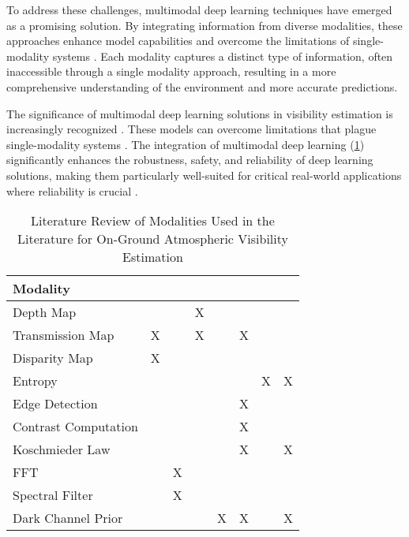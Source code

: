 
To address these challenges, multimodal deep learning techniques have emerged as a promising solution. By integrating information from diverse modalities, these approaches enhance model capabilities and overcome the limitations of single-modality systems \cite{liu2018learn, castanedo2013review, molino2021improved, blasch2021machine}. Each modality captures a distinct type of information, often inaccessible through a single modality approach, resulting in a more comprehensive understanding of the environment and more accurate predictions.

The significance of multimodal deep learning solutions in visibility estimation is increasingly recognized \cite{palvanov_visnet_2019, department_of_computer_science_chu_hai_college_of_higher_education_80_castle_peak_road_castle_peak_bay_tuen_mun_nt_hong_kong_meteorology_2020, AitOuadil2023, app11030997, Zhang2023, You2022, Chen2022, Wauben2016, Cheng2018, Zhou2021}. These models can overcome limitations that plague single-modality systems \cite{huang2021makesmultimodallearningbetter}. The integration of multimodal deep learning (\cref{tab:literature_review}) significantly enhances the robustness, safety, and reliability of deep learning solutions, making them particularly well-suited for critical real-world applications where reliability is crucial \cite{6817512, liang2024foundationsmultisensoryartificialintelligence}.



\begin{table}[htbp]
\centering
\caption{Literature Review of Modalities Used in the Literature for On-Ground Atmospheric Visibility Estimation}
\label{tab:literature_review}
\begin{tabular}{@{}lccccccc@{}}
\toprule
\textbf{Modality} & \textbf{\cite{You2022}} & \textbf{\cite{Palvanov2019}} & \textbf{\cite{Zhang2023}} & \textbf{\cite{Chen2022}} & \textbf{\cite{Wauben2016}} & \textbf{\cite{Cheng2018}} & \textbf{\cite{Zhou2021}} \\
\midrule
Depth Map &  & & X & & & & \\
Transmission Map  & X & & X & & X & & \\
Disparity Map & X & & & & & &  \\
Entropy & & & & &  & X & X \\
Edge Detection & & & & & X & &  \\
Contrast Computation   & & & & & X & & \\
Koschmieder Law & &  & & & X & & X \\
FFT & & X & & & & & \\
Spectral Filter & & X & & & & & \\
Dark Channel Prior & & & & X & X & & X\\
\bottomrule
\end{tabular}
\end{table}

